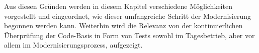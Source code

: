 
Aus diesen Gründen werden in diesem Kapitel verschiedene Möglichkeiten vorgestellt und eingeordnet, wie dieser umfangreiche Schritt der Modernisierung begonnen werden kann. Weiterhin wird die Relevanz von der kontinuierlichen Überprüfung der Code-Basis in Form von Tests sowohl im Tagesbetrieb, aber vor allem im Modernisierungsprozess, aufgezeigt.




